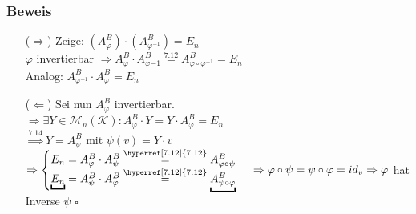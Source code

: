 \documentclass[12pt,titlepage, pdf]{article}
\newcommand{\K}{\mathcal{K}}
\newcommand{\M}{\mathcal{M}}
\newcommand{\qed}{\hfill$\square$}
\renewcommand{\>}{\rightarrow}
\renewcommand{\*}{\cdot}
\renewcommand{\phi}{\varphi}
\begin{document}
\subsubsection*{Beweis}
\begin{itemize}
	\item[($\Rightarrow$)] Zeige: $(A_\phi^B) \cdot (A_{\phi^{-1}}^B) = E_n$\\
	$\phi$ invertierbar $\Rightarrow A_\phi^B \cdot A_{\phi{-1}}^B \overset{\hyperref[7.12]{7.12}}{=} A_{\phi \circ \phi^{-1}}^B = E_n$\\
	Analog: $A_{\phi^{-1}}^B \cdot A_\phi^B = E_n$
	\item[($\Leftarrow$)] Sei nun $A_\phi^B$ invertierbar. \\
	$\Rightarrow \exists Y \in \M_n(\K): A_\phi^B \cdot Y = Y \cdot A_\phi^B = E_n$\\
	$\overset{\hyperref[7.14]{7.14}}{\Rightarrow} Y = A_\psi^B$ mit $\psi(v) = Y\*v$\\
	$\Rightarrow \begin{cases}
	E_n = A_\phi^B \cdot A_\psi^B \overset{\hyperref[7.12]{7.12}}{=} A_{\phi \circ \psi}^B\\
	\underbracket{E_n} = A_\psi^B \cdot A_\phi^B \overset{\hyperref[7.12]{7.12}}{=} \underbracket{A_{\psi \circ \phi}^B}
	\end{cases}\\
	\Rightarrow \phi \circ \psi = \psi \circ \phi = id_v\\
	\Rightarrow \phi$ hat Inverse $\psi$ \qed
\end{itemize}
\end{document}
